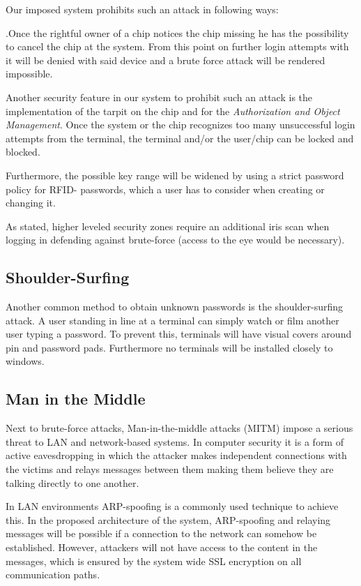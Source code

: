 \documentclass[12pt,a4paper,titlepage,oneside]{scrartcl}
\begin{document}
Our imposed system prohibits such an attack in following ways:

.Once the rightful owner of a chip notices the chip missing he has the possibility to cancel the chip at the system. From this point on further login attempts with it will be denied with said device and a brute force attack will be rendered impossible.

Another security feature in our system to prohibit such an attack is the implementation of the tarpit on the chip and for the \emph{Authorization and Object Management}. Once the system or the chip recognizes too many unsuccessful login attempts from the terminal, the terminal and/or the user/chip can be locked and blocked.

Furthermore, the possible key range will be widened by using a strict password policy for RFID- passwords, which a user has to consider when creating or changing it.

As stated, higher leveled security zones require an additional iris scan when logging in defending against brute-force (access to the eye would be necessary).

\subsection{Shoulder-Surfing}

Another common method to obtain unknown passwords is the shoulder-surfing attack. A user standing in line at a terminal can simply watch or film another user typing a password. To prevent this, terminals will have visual covers around pin  and password pads. Furthermore no terminals will be installed closely to windows.

\subsection{Man in the Middle}

Next to brute-force attacks, Man-in-the-middle attacks (MITM) impose a serious threat to LAN and network-based systems. In computer security it is a form of active eavesdropping in which the attacker makes independent connections with the victims and relays messages between them making them believe they are talking directly to one another.

In LAN environments ARP-spoofing is a commonly used technique to achieve this. In the proposed architecture of the system, ARP-spoofing and relaying messages will be possible if a connection to the network can somehow be established. However, attackers will not have access to the content in the messages, which is ensured by the system wide SSL encryption on all communication paths.
\end{document}
